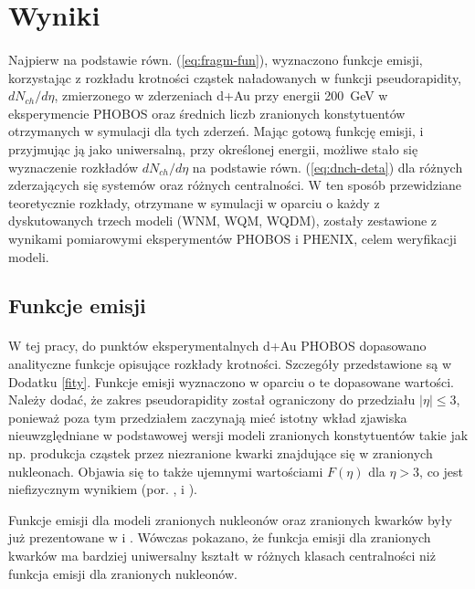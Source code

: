 \documentclass[a4paper,12pt]{article}
\begin{document}
\newpage
\section{Wyniki}
\paragraph{}
Najpierw na podstawie równ. (\ref{eq:fragm-fun}), wyznaczono funkcje emisji, korzystając z rozkładu krotności cząstek naładowanych w funkcji pseudorapidity, $dN_{ch}/d\eta$, zmierzonego w zderzeniach d+Au przy energii 200~GeV w eksperymencie PHOBOS \cite{Back:2004mr} oraz średnich liczb zranionych konstytuentów otrzymanych w symulacji dla tych zderzeń. Mając gotową funkcję emisji, i przyjmując ją jako uniwersalną, przy określonej energii, możliwe stało się wyznaczenie rozkładów $dN_{ch}/d\eta$ na podstawie równ. (\ref{eq:dnch-deta}) dla różnych zderzających się systemów oraz różnych centralności. W ten sposób przewidziane teoretycznie rozkłady, otrzymane w symulacji w oparciu o każdy z dyskutowanych trzech modeli (WNM, WQM, WQDM), zostały zestawione z wynikami pomiarowymi eksperymentów PHOBOS i PHENIX, celem weryfikacji modeli.


\subsection{Funkcje emisji} \label{fkcje-emisji}
\paragraph{}
W tej pracy, do punktów eksperymentalnych d+Au PHOBOS \cite{Back:2004mr} dopasowano analityczne funkcje opisujące rozkłady krotności. Szczegóły przedstawione są w Dodatku \ref{fity}. Funkcje emisji wyznaczono w oparciu o te dopasowane wartości. Należy dodać, że zakres pseudorapidity został ograniczony do przedziału $|\eta| \le 3$, ponieważ poza tym przedziałem zaczynają mieć istotny wkład zjawiska nieuwzględniane w podstawowej wersji modeli zranionych konstytuentów takie jak np. produkcja cząstek przez niezranione kwarki znajdujące się w zranionych nukleonach. Objawia się to także ujemnymi wartościami $F(\eta)$ dla $\eta > 3$, co jest niefizycznym wynikiem (por. \cite{Bialas:2006kw}, \cite{Barej:pracaInz18} i \cite{Barej:2017kcw}).

Funkcje emisji dla modeli zranionych nukleonów oraz zranionych kwarków były już prezentowane w \cite{Barej:pracaInz18} i \cite{Barej:2017kcw}. Wówczas pokazano, że funkcja emisji dla zranionych kwarków ma bardziej uniwersalny kształt w różnych klasach centralności niż funkcja emisji dla zranionych nukleonów. 
\end{document}
